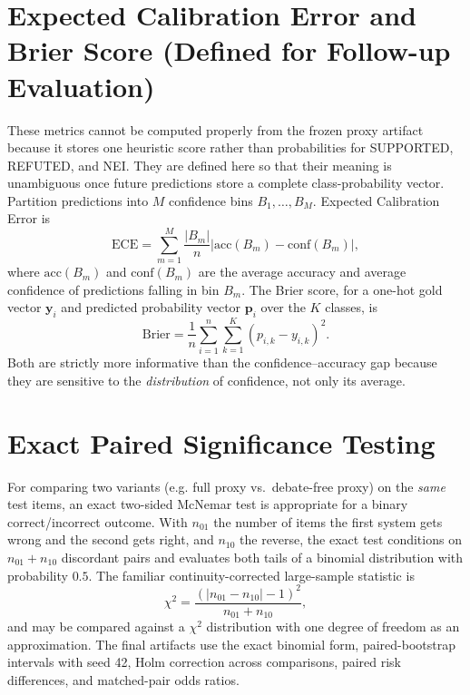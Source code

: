 \documentclass[12pt,a4paper,openany]{report}
\begin{document}
\section{Expected Calibration Error and Brier Score (Defined for Follow-up Evaluation)}
These metrics cannot be computed properly from the frozen proxy artifact because it stores one heuristic score rather than probabilities for SUPPORTED, REFUTED, and NEI. They are defined here so that their meaning is unambiguous once future predictions store a complete class-probability vector. Partition predictions into $M$ confidence bins $B_1,\ldots,B_M$. Expected Calibration Error is
\[
\mathrm{ECE} = \sum_{m=1}^{M} \frac{|B_m|}{n} \left| \mathrm{acc}(B_m) - \mathrm{conf}(B_m) \right|,
\]
where $\mathrm{acc}(B_m)$ and $\mathrm{conf}(B_m)$ are the average accuracy and average confidence of predictions falling in bin $B_m$. The Brier score, for a one-hot gold vector $\mathbf{y}_i$ and predicted probability vector $\mathbf{p}_i$ over the $K$ classes, is
\[
\mathrm{Brier} = \frac{1}{n}\sum_{i=1}^{n}\sum_{k=1}^{K} (p_{i,k} - y_{i,k})^2 .
\]
Both are strictly more informative than the confidence--accuracy gap because they are sensitive to the \emph{distribution} of confidence, not only its average.

\section{Exact Paired Significance Testing}
For comparing two variants (e.g. full proxy vs.\ debate-free proxy) on the \emph{same} test items, an exact two-sided McNemar test is appropriate for a binary correct/incorrect outcome. With $n_{01}$ the number of items the first system gets wrong and the second gets right, and $n_{10}$ the reverse, the exact test conditions on $n_{01}+n_{10}$ discordant pairs and evaluates both tails of a binomial distribution with probability $0.5$. The familiar continuity-corrected large-sample statistic is
\[
\chi^2 = \frac{(|n_{01}-n_{10}|-1)^2}{n_{01}+n_{10}},
\]
and may be compared against a $\chi^2$ distribution with one degree of freedom as an approximation. The final artifacts use the exact binomial form, paired-bootstrap intervals with seed 42, Holm correction across comparisons, paired risk differences, and matched-pair odds ratios.
\end{document}
